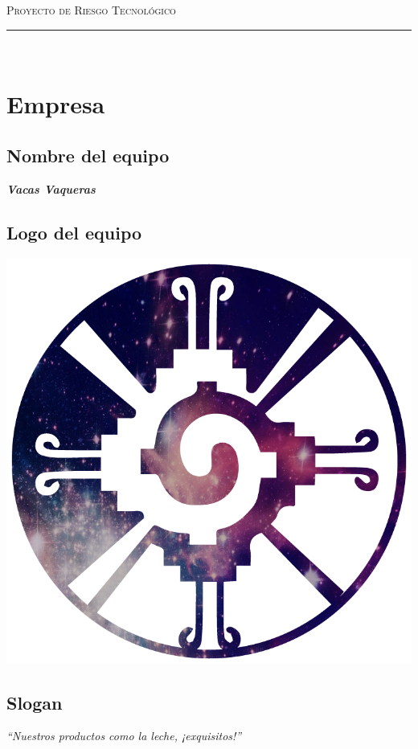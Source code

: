 \documentclass{article}
\begin{document}
\marginsize{2cm}{2cm}{1cm}{2cm} 

\begin{center}
  {\LARGE \scshape Proyecto de Riesgo Tecnológico\\\vspace{10mm} }
  \rule{0.8\textwidth}{.8pt}\\
\end{center}

\section*{Empresa}

\subsection*{Nombre del equipo} \textit{\textbf{Vacas Vaqueras}}
\subsection*{Logo del equipo}
\begin{center}
  \includegraphics[scale=.2]{../imagenes/logo.jpg}
\end{center}
\subsection*{Slogan}
\begin{center}
  \textit{``Nuestros productos como la leche, ¡exquisitos!''}
\end{center}
\end{document}
